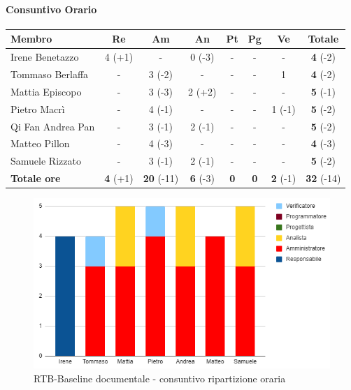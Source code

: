\paragraph{Consuntivo Orario}
\begin{center}
	\renewcommand{\arraystretch}{1.8} %
	\begin{tabular}{ |m{8em}|c|c|c|c|c|c|c| }
	\hline
	\textbf{Membro} & \textbf{Re} & \textbf{Am} &  \textbf{An} &  \textbf{Pt} &  \textbf{Pg} &  \textbf{Ve} &  \textbf{Totale}\\
    \hline
    Irene Benetazzo   & 4 (+1) & -      & 0 (-3) & - & - & -     & \textbf{4} (-2) \\
    \hline
    Tommaso Berlaffa  & -      & 3 (-2) & -      & - & - & 1      & \textbf{4} (-2) \\
    \hline
    Mattia Episcopo   & -      & 3 (-3) & 2 (+2) & - & - & -      & \textbf{5} (-1) \\
    \hline
    Pietro Macrì      & -      & 4 (-1) & -      & - & - & 1 (-1) & \textbf{5} (-2) \\
    \hline
    Qi Fan Andrea Pan & -      & 3 (-1) & 2 (-1) & - & - & -      & \textbf{5} (-2) \\
    \hline
    Matteo Pillon     & -      & 4 (-3) & -      & - & - & -      & \textbf{4} (-3) \\
    \hline
    Samuele Rizzato   & -      & 3 (-1) & 2 (-1) & - & - & -      & \textbf{5} (-2) \\
    \hline
    \textbf{Totale ore} & \textbf{4} (+1) & \textbf{20} (-11) &  \textbf{6} (-3) &  \textbf{0} &  \textbf{0} &  \textbf{2} (-1) &  \textbf{32} (-14)\\
    \hline
	\end{tabular}
\end{center}
\begin{figure}[H]
    \centering\includegraphics{images/consuntivo/RTB-documentale-ore.png}
    \caption{RTB-Baseline documentale - consuntivo ripartizione oraria}
\end{figure}

